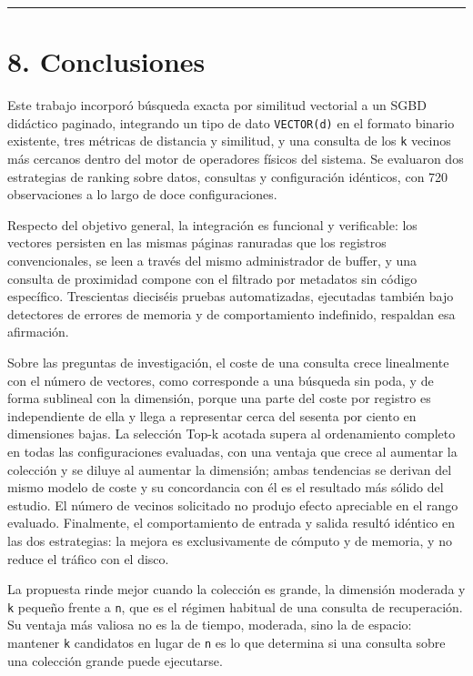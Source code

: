 \documentclass[11pt,a4paper]{article}
\let\subsection\section
\begin{document}
\begin{center}\rule{0.5\linewidth}{0.5pt}\end{center}

\subsection{8. Conclusiones}\label{8-conclusiones}

Este trabajo incorporó búsqueda exacta por similitud vectorial a un SGBD
didáctico paginado, integrando un tipo de dato \texttt{VECTOR(d)} en el
formato binario existente, tres métricas de distancia y similitud, y una
consulta de los \texttt{k} vecinos más cercanos dentro del motor de
operadores físicos del sistema. Se evaluaron dos estrategias de ranking
sobre datos, consultas y configuración idénticos, con 720 observaciones
a lo largo de doce configuraciones.

Respecto del objetivo general, la integración es funcional y
verificable: los vectores persisten en las mismas páginas ranuradas que
los registros convencionales, se leen a través del mismo administrador
de buffer, y una consulta de proximidad compone con el filtrado por
metadatos sin código específico. Trescientas dieciséis pruebas
automatizadas, ejecutadas también bajo detectores de errores de memoria
y de comportamiento indefinido, respaldan esa afirmación.

Sobre las preguntas de investigación, el coste de una consulta crece
linealmente con el número de vectores, como corresponde a una búsqueda
sin poda, y de forma sublineal con la dimensión, porque una parte del
coste por registro es independiente de ella y llega a representar cerca
del sesenta por ciento en dimensiones bajas. La selección Top-k acotada
supera al ordenamiento completo en todas las configuraciones evaluadas,
con una ventaja que crece al aumentar la colección y se diluye al
aumentar la dimensión; ambas tendencias se derivan del mismo modelo de
coste y su concordancia con él es el resultado más sólido del estudio.
El número de vecinos solicitado no produjo efecto apreciable en el rango
evaluado. Finalmente, el comportamiento de entrada y salida resultó
idéntico en las dos estrategias: la mejora es exclusivamente de cómputo
y de memoria, y no reduce el tráfico con el disco.

La propuesta rinde mejor cuando la colección es grande, la dimensión
moderada y \texttt{k} pequeño frente a \texttt{n}, que es el régimen
habitual de una consulta de recuperación. Su ventaja más valiosa no es
la de tiempo, moderada, sino la de espacio: mantener \texttt{k}
candidatos en lugar de \texttt{n} es lo que determina si una consulta
sobre una colección grande puede ejecutarse.
\end{document}
